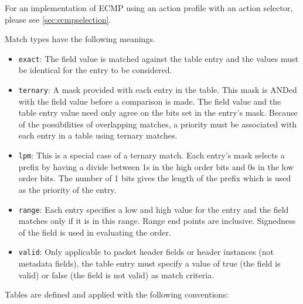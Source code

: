 \documentclass[12pt]{article}
\begin{document}
For an implementation of ECMP using an action profile with an action selector,
please see \ref{sec:ecmpselection}.

Match types have the following meanings.

\begin{itemize}
\item
\texttt{exact}: The field value is matched against the table entry and the values 
must be identical for the entry to be considered.
\item
\texttt{ternary}:  A mask provided with each entry in the table. This mask is ANDed 
with the field value before a comparison is made.  The field value and the 
table entry value need only agree on the bits set in the entry's mask.  Because 
of the possibilities of overlapping matches, a priority must be associated 
with each entry in a table using ternary matches.
\item
\texttt{lpm}:  This is a special case of a ternary match. Each entry's mask selects 
a prefix by having a divide between 1s in the high order bits and 0s in the 
low order bits. The number of 1 bits gives the length of the prefix which 
is used as the priority of the entry.
\item
\texttt{range}: Each entry specifies a low and high value for the entry and the field 
matches only if it is in this range. Range end points are inclusive. Signedness 
of the field is used in evaluating the order.
\item
\texttt{valid}: Only applicable to packet header fields or header instances (not metadata 
fields), the table entry must specify a value of true (the field is valid) 
or false (the field is not valid) as match criteria.
\end{itemize}

Tables are defined and applied with the following conventions:
\end{document}
